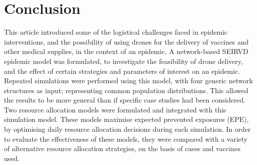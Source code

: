 \documentclass[10pt,letterpaper]{article}
\begin{document}

\section*{Conclusion}
This article introduced some of the logistical challenges faced in epidemic interventions, and the possibility of using drones for the delivery of vaccines and other medical supplies, in the context of an epidemic.
A network-based SEIRVD epidemic model was formulated, to investigate the feasibility of drone delivery, and the effect of certain strategies and parameters of interest on an epidemic. Repeated simulations were performed using this model, with four generic network structures as input; representing common population distributions. This allowed the results to be more general than if specific case studies had been considered.
Two resource allocation models were formulated and integrated with this simulation model. These models maximise expected prevented exposures (EPE), by optimising daily resource allocation decisions during each simulation. In order to evaluate the effectiveness of these models, they were compared with a variety of alternative resource allocation strategies, on the basis of cases and vaccines used.
\end{document}
